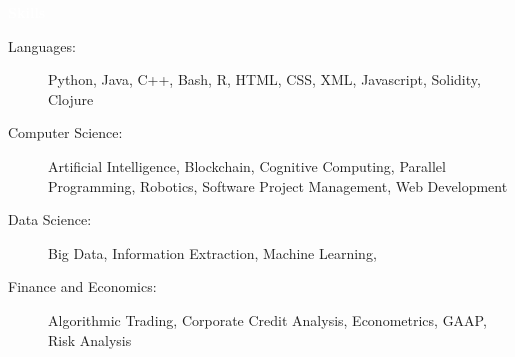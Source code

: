 \documentclass[letterpaper,11pt]{article}
\newcommand{\resheading}[1]{{\large \colorbox{mypurple}{\begin{minipage}{\textwidth}{\textbf{#1 \vphantom{p\^{E}}}}\end{minipage}}}}
\begin{document}
	\resheading{\textcolor{white}{Skills}}
	
	\begin{description}
		\item[Languages:] Python, Java, C++, Bash, R, HTML, CSS, XML, Javascript, Solidity, Clojure
		\item[Computer Science:] Artificial Intelligence, Blockchain, Cognitive Computing, Parallel Programming, Robotics, Software Project Management, Web Development
		\item[Data Science:] Big Data, Information Extraction, Machine Learning, 
		\item[Finance and Economics:] Algorithmic Trading, Corporate Credit Analysis, Econometrics, GAAP, Risk Analysis
	\end{description}
	
\end{document}
